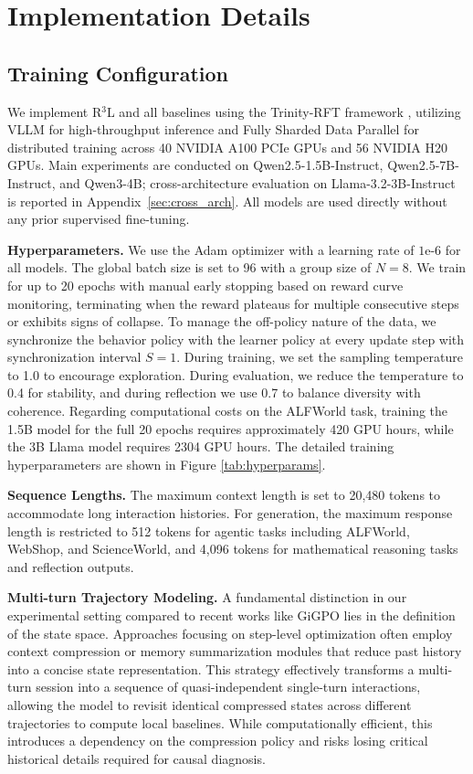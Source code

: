\section{Implementation Details}
\label{app:implementation}

\subsection{Training Configuration}
We implement R$^3$L and all baselines using the Trinity-RFT framework \cite{pan2025trinity}, utilizing VLLM for high-throughput inference and Fully Sharded Data Parallel for distributed training across 40 NVIDIA A100 PCIe GPUs and 56 NVIDIA H20 GPUs. Main experiments are conducted on Qwen2.5-1.5B-Instruct, Qwen2.5-7B-Instruct, and Qwen3-4B; cross-architecture evaluation on Llama-3.2-3B-Instruct is reported in Appendix~\ref{sec:cross_arch}. All models are used directly without any prior supervised fine-tuning.

\textbf{Hyperparameters.} We use the Adam optimizer with a learning rate of $1\text{e-}6$ for all models. The global batch size is set to 96 with a group size of $N=8$. We train for up to 20 epochs with manual early stopping based on reward curve monitoring, terminating when the reward plateaus for multiple consecutive steps or exhibits signs of collapse. To manage the off-policy nature of the data, we synchronize the behavior policy with the learner policy at every update step with synchronization interval $S=1$. During training, we set the sampling temperature to 1.0 to encourage exploration. During evaluation, we reduce the temperature to 0.4 for stability, and during reflection we use 0.7 to balance diversity with coherence. Regarding computational costs on the ALFWorld task, training the 1.5B model for the full 20 epochs requires approximately 420 GPU hours, while the 3B Llama model requires 2304 GPU hours. The detailed training hyperparameters are shown in Figure \ref{tab:hyperparams}.

\textbf{Sequence Lengths.} The maximum context length is set to 20,480 tokens to accommodate long interaction histories. For generation, the maximum response length is restricted to 512 tokens for agentic tasks including ALFWorld, WebShop, and ScienceWorld, and 4,096 tokens for mathematical reasoning tasks and reflection outputs.

\textbf{Multi-turn Trajectory Modeling.} A fundamental distinction in our experimental setting compared to recent works like GiGPO \cite{feng2025group} lies in the definition of the state space. Approaches focusing on step-level optimization often employ context compression or memory summarization modules that reduce past history into a concise state representation. This strategy effectively transforms a multi-turn session into a sequence of quasi-independent single-turn interactions, allowing the model to revisit identical compressed states across different trajectories to compute local baselines. While computationally efficient, this introduces a dependency on the compression policy and risks losing critical historical details required for causal diagnosis.

